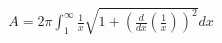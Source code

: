 \documentclass[preview]{standalone}
\begin{document}
\begin{align*}
A = 2\pi \int_1^{\infty} \frac{1}{x} \sqrt{1 + \left(\frac{d}{dx}(\frac{1}{x})\right)^2} dx
\end{align*}
\end{document}
